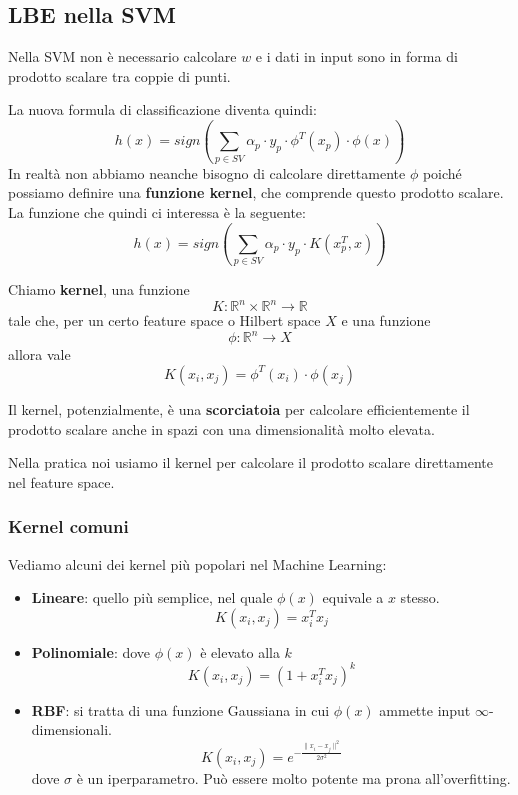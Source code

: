 \subsection{LBE nella SVM}
Nella SVM non \`e necessario calcolare $w$ e i dati in input sono in forma di prodotto scalare tra coppie di punti.

La nuova formula di classificazione diventa quindi:
\[ h(x) = sign \left( \sum_{p \in SV} \alpha_p \cdot y_p \cdot \phi^T(x_p) \cdot \phi(x)  \right) \]
In realt\`a non abbiamo neanche bisogno di calcolare direttamente $\phi$ poich\'e possiamo definire una
\textbf{funzione kernel}, che comprende questo prodotto scalare. La funzione che quindi ci interessa \`e la seguente:
\[ h(x) = sign \left( \sum_{p \in SV} \alpha_p \cdot y_p \cdot K(x_p^T, x) \right) \]

\begin{definition}
	Chiamo \textbf{kernel}, una funzione
	\[ K : \mathbb{R}^n \times \mathbb{R}^n \rightarrow \mathbb{R} \]
	tale che, per un certo feature space o Hilbert space $X$ e una funzione
	\[ \phi : \mathbb{R}^n \rightarrow X \]
	allora vale
	\[ K(x_i, x_j) = \phi^T(x_i) \cdot \phi(x_j) \]
\end{definition}
Il kernel, potenzialmente, \`e una \textbf{scorciatoia} per calcolare efficientemente il prodotto scalare anche in spazi con
una dimensionalit\`a molto elevata.

Nella pratica noi usiamo il kernel per calcolare il prodotto scalare direttamente nel feature space.

\subsubsection{Kernel comuni}
Vediamo alcuni dei kernel pi\`u popolari nel Machine Learning:
\begin{itemize}
	\item \textbf{Lineare}: quello pi\`u semplice, nel quale $\phi(x)$ equivale a $x$ stesso.
	      \[ K(x_i, x_j) = x_i^T x_j \]
	\item \textbf{Polinomiale}: dove $\phi(x)$ \`e elevato alla $k$
	      \[ K(x_i, x_j) = (1 + x_i^T x_j)^k \]
	\item \textbf{RBF}: si tratta di una funzione Gaussiana in cui $\phi(x)$ ammette input $\infty$-dimensionali.
	      \[ K(x_i, x_j) = e^{-\displaystyle\frac{\| x_i - x_j \|^2}{2 \sigma^2}} \]
	      dove $\sigma$ \`e un iperparametro. Pu\`o essere molto potente ma prona all'overfitting.
\end{itemize}

